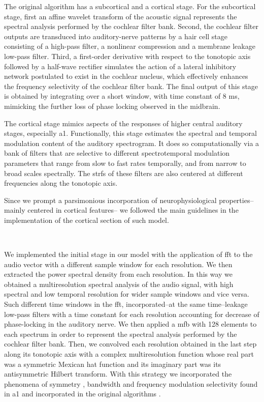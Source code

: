 \documentclass[10pt,letterpaper]{article}
\begin{document}
The original algorithm has a subcortical and a cortical stage.
For the subcortical stage, first an affine wavelet transform of the acoustic signal
represents the spectral analysis performed by the cochlear filter bank.
Second, the cochlear filter outputs are transduced into auditory-nerve
patterns by a hair cell stage consisting of a high-pass filter,
a nonlinear compression and a membrane leakage low-pass filter.
Third, a first-order derivative with respect to the tonotopic axis
followed by a half-wave rectifier
simulates the action of a lateral inhibitory
network postulated to exist in the cochlear nucleus,
which effectively enhances the frequency
selectivity of the cochlear filter bank.
The final output of this stage is obtained by integrating
over a short window, with time constant of 8 ms, mimicking
the further loss of phase locking observed
in the midbrain.

The cortical stage mimics aspects of the responses of higher
central auditory stages, especially \gls{a1}.
Functionally, this stage estimates the
spectral and temporal modulation content of the auditory
spectrogram. It does so computationally via a bank of filters
that are selective to different spectrotemporal modulation parameters
that range from slow to fast rates temporally, and
from narrow to broad scales spectrally. The \glspl{strf}
of these filters are also centered at
different frequencies along the tonotopic axis.

Since we prompt a parsimonious incorporation of neurophysiological
properties--mainly centered in cortical features--
we followed the main guidelines in the implementation of the cortical section of such model.

~

We implemented the initial stage in our model with the application of \gls{fft} to the audio vector
with a different sample window for each resolution.
We then extracted the power spectral density from each resolution.
In this way we obtained a multiresolution spectral analysis of the audio signal,
with high spectral and low temporal resolution for wider sample windows and
vice versa.
Such different time windows in the \gls{fft},
incorporated--at the same time--leakage low-pass filters with a time constant for each
resolution accounting for decrease of phase-locking in the auditory nerve.
We then applied a \gls{mfb} with 128 elements to each spectrum
in order to represent the spectral analysis performed by the cochlear filter bank.
Then, we convolved each resolution obtained in the last step along its tonotopic axis
with a complex multiresolution function whose real part
was a symmetric Mexican hat function and its imaginary part was its antisymmetric Hilbert transform.
With this strategy we incorporated the phenomena of symmetry \cite{shamma_1993}, bandwidth \cite{schreiner_1990}
and frequency modulation selectivity \cite{shamma_1993,heil_1992,mendelson_1985}
found in \gls{a1} and incorporated in the original algorithms \cite{wang_1995}.
\end{document}
